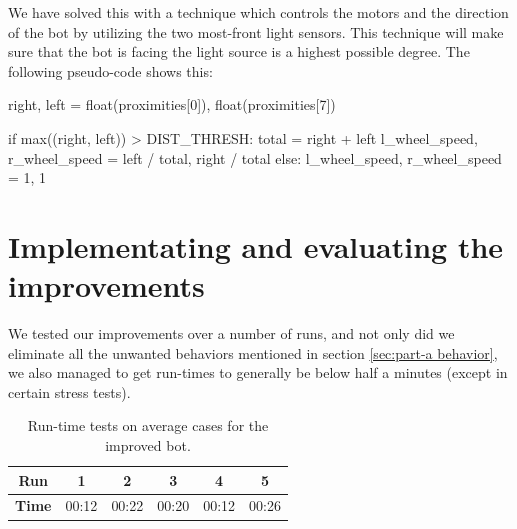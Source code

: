 \documentclass[a4paper,10pt]{article}
\begin{document}
We have solved this with a technique which controls the motors and the 
direction of the bot by utilizing the two most-front light sensors. This 
technique will make sure that the bot is facing the light source is a highest 
possible degree. The following pseudo-code shows this:

\begin{python}
right, left = float(proximities[0]), float(proximities[7])

if max((right, left)) > DIST_THRESH:
    total = right + left
    l_wheel_speed, r_wheel_speed = left / total, right / total
else:
    l_wheel_speed, r_wheel_speed = 1, 1
\end{python}

\section{Implementating and evaluating the improvements}

We tested our improvements over a number of runs, and not only did we eliminate
all the unwanted behaviors  mentioned in section \ref{sec:part-a behavior}, we also managed 
to get run-times to generally be below half a minutes (except in certain stress tests).

\begin{table}
    \centering
    \begin{tabular}{c|c|c|c|c|c}
        \textbf{Run}    & \textbf{1} & \textbf{2} & \textbf{3} &
        \textbf{4}      & \textbf{5}     \\ \hline
        \textbf{Time}   & 00:12 & 00:22 & 00:20 & 00:12 & 00:26 \\
    \end{tabular}
    \caption{Run-time tests on average cases for the improved bot.}
\end{table}
\end{document}
